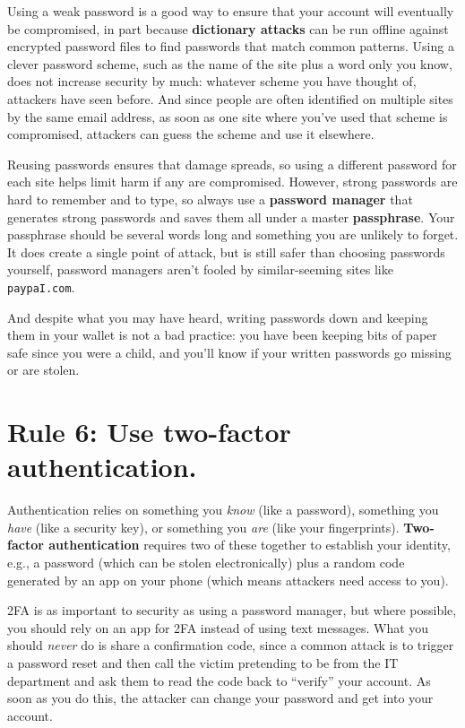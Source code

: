 \documentclass[10pt,letterpaper]{article}
\newcommand{\rulemajor}[1]{\section*{#1}}
\begin{document}
Using a weak password is a good way to ensure that your account will eventually be compromised,
in part because \textbf{dictionary attacks} can be run offline against encrypted password files
to find passwords that match common patterns.
Using a clever password scheme,
such as the name of the site plus a word only you know,
does not increase security by much:
whatever scheme you have thought of,
attackers have seen before.
And since people are often identified on multiple sites by the same email address,
as soon as one site where you've used that scheme is compromised,
attackers can guess the scheme and use it elsewhere.

Reusing passwords ensures that damage spreads,
so using a different password for each site helps limit harm if any are compromised.
However,
strong passwords are hard to remember and to type,
so always use a \textbf{password manager}
that generates strong passwords
and saves them all under a master \textbf{passphrase}.
Your passphrase should be several words long
and something you are unlikely to forget.
It does create a single point of attack,
but is still safer than choosing passwords yourself,
password managers aren't fooled by similar-seeming sites like \texttt{paypaI.com}.

And despite what you may have heard,
writing passwords down and keeping them in your wallet is not a bad practice:
you have been keeping bits of paper safe since you were a child,
and you'll know if your written passwords go missing or are stolen.

\rulemajor{Rule 6: Use two-factor authentication.}

Authentication relies on something you \emph{know} (like a password),
something you \emph{have} (like a security key),
or something you \emph{are} (like your fingerprints).
\textbf{Two-factor authentication} requires two of these together to establish your identity,
e.g.,
a password (which can be stolen electronically)
plus a random code generated by an app on your phone
(which means attackers need access to you).

2FA is as important to security as using a password manager,
but where possible,
you should rely on an app for 2FA instead of using text messages.
What you should \emph{never} do is share a confirmation code,
since a common attack is to trigger a password reset
and then call the victim pretending to be from the IT department
and ask them to read the code back to ``verify'' your account.
As soon as you do this,
the attacker can change your password and get into your account.
\end{document}
